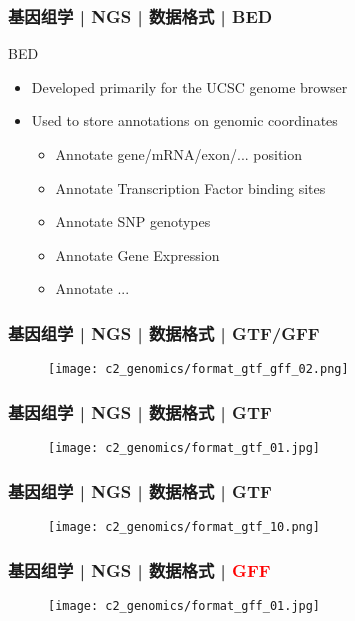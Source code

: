 \begin{frame}
  \frametitle{基因组学 | NGS | 数据格式 | BED}
  \begin{block}{BED}
    \begin{itemize}
      \item Developed primarily for the UCSC genome browser
      \item Used to store annotations on genomic coordinates
        \begin{itemize}
          \item Annotate gene/mRNA/exon/... position
          \item Annotate Transcription Factor binding sites
          \item Annotate SNP genotypes
          \item Annotate Gene Expression
          \item Annotate ...
        \end{itemize}
    \end{itemize}
  \end{block}
\end{frame}

\begin{frame}
  \frametitle{基因组学 | NGS | 数据格式 | GTF/GFF}
  \begin{figure}
    \centering
    \texttt{[image: c2\_genomics/format\_gtf\_gff\_02.png]}
  \end{figure}
\end{frame}
    
\begin{frame}
  \frametitle{基因组学 | NGS | 数据格式 | GTF}
  \begin{figure}
    \centering
    \texttt{[image: c2\_genomics/format\_gtf\_01.jpg]}
  \end{figure}
\end{frame}
    
\begin{frame}
  \frametitle{基因组学 | NGS | 数据格式 | GTF}
  \begin{figure}
    \centering
    \texttt{[image: c2\_genomics/format\_gtf\_10.png]}
  \end{figure}
\end{frame}
    
\begin{frame}
  \frametitle{基因组学 | NGS | 数据格式 | \textcolor{red}{GFF}}
  \begin{figure}
    \centering
    \texttt{[image: c2\_genomics/format\_gff\_01.jpg]}
  \end{figure}
\end{frame}
    
